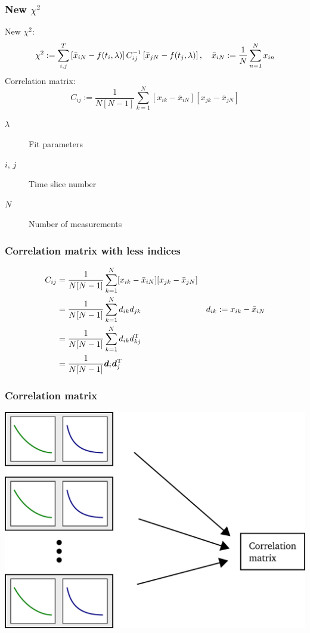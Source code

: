\documentclass[english, fleqn]{beamer}
\begin{document}
\begin{frame}
    \frametitle{New $\chi^2$}

    New $\chi^2$:
    \[
        \chi^2 := \sum_{i, j}^T
        \left[ \bar x_{iN} - f(t_i, \lambda) \right]
        C^{-1}_{ij}
        \left[ \bar x_{jN} - f(t_j, \lambda) \right]
        \eqnsep
        \bar x_{iN} := \frac 1N \sum_{n=1}^N x_{in}
    \]
    Correlation matrix:
    \[
        C_{ij} := \frac{1}{N[N-1]} \sum_{k=1}^N
        [x_{ik} - \bar x_{iN}] [x_{jk} - \bar x_{jN}]
    \]

    \begin{description}
        \item[$\lambda$] Fit parameters
        \item[$i$, $j$] Time slice number
        \item[$N$] Number of measurements
    \end{description}
\end{frame}

\begin{frame}
    \frametitle{Correlation matrix with less indices}

    \begin{align*}
        C_{ij}
        &= \frac{1}{N[N-1]} \sum_{k=1}^N [x_{ik} - \bar x_{iN}] [x_{jk} - \bar x_{jN}] \\
        &= \frac{1}{N[N-1]} \sum_{k=1}^N d_{ik} d_{jk} & d_{ik} := x_{ik} - \bar x_{iN} \\
        &= \frac{1}{N[N-1]} \sum_{k=1}^N d_{ik} d_{kj}^{\text T} \\
        &= \frac{1}{N[N-1]} \vec d_{i} \vec d_{j}^{\text T} \\
    \end{align*}
\end{frame}

\begin{frame}
    \frametitle{Correlation matrix}
    \begin{center}
        \includegraphics[scale=\scale]{sketches/05-matrix.pdf}
    \end{center}
\end{frame}
\end{document}
